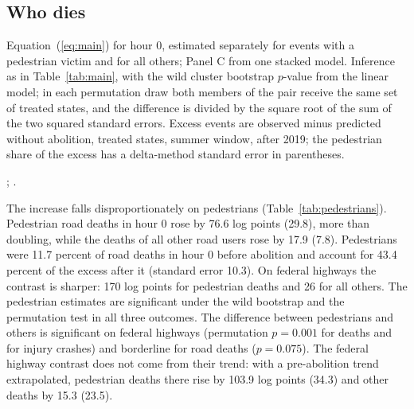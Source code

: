 \subsection{Who dies}

\begin{table}[tbp]
  \caption{Pedestrians and Other Road Users in the Hour after Sunset}
  \label{tab:pedestrians}
  \centering\footnotesize
  
  \begin{tablenotes}[Notes]
  Equation~(\ref{eq:main}) for hour 0, estimated separately for events with a pedestrian victim and for all others; Panel C from one stacked model. Inference as in Table~\ref{tab:main}, with the wild cluster bootstrap $p$-value from the linear model; in each permutation draw both members of the pair receive the same set of treated states, and the difference is divided by the square root of the sum of the two squared standard errors. Excess events are observed minus predicted without abolition, treated states, summer window, after 2019; the pedestrian share of the excess has a delta-method standard error in parentheses.
  \end{tablenotes}
  \begin{tablenotes}[Sources]
  \citet{datasus2025sim}; \citet{prf2025dados}.
  \end{tablenotes}
\end{table}

The increase falls disproportionately on pedestrians (Table~\ref{tab:pedestrians}). Pedestrian road deaths in hour 0 rose by 76.6 log points (29.8), more than doubling, while the deaths of all other road users rose by 17.9 (7.8). Pedestrians were 11.7 percent of road deaths in hour 0 before abolition and account for 43.4 percent of the excess after it (standard error 10.3). On federal highways the contrast is sharper: 170 log points for pedestrian deaths and 26 for all others. The pedestrian estimates are significant under the wild bootstrap and the permutation test in all three outcomes. The difference between pedestrians and others is significant on federal highways (permutation $p=0.001$ for deaths and for injury crashes) and borderline for road deaths ($p=0.075$). The federal highway contrast does not come from their trend: with a pre-abolition trend extrapolated, pedestrian deaths there rise by 103.9 log points (34.3) and other deaths by 15.3 (23.5). %

